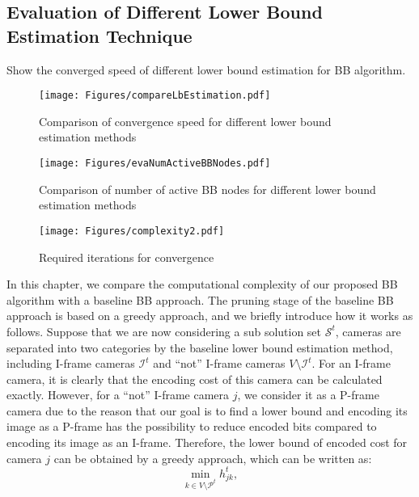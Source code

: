\subsection{Evaluation of Different Lower Bound Estimation Technique}
{\color{red}Show the converged speed of different lower bound estimation for BB algorithm.}
\begin{figure}
\begin{center}
\texttt{[image: Figures/compareLbEstimation.pdf]}
\caption{\label{fig::compareLbEstimation} Comparison of convergence speed for different lower bound estimation methods}
\end{center}
\end{figure}
%
\begin{figure}
\begin{center}
\texttt{[image: Figures/evaNumActiveBBNodes.pdf]}
\caption{\label{fig::evaNumActiveBBNodes} Comparison of number of active BB nodes for different lower bound estimation methods}
\end{center}
\end{figure}
%
\begin{figure}
\begin{center}
\texttt{[image: Figures/complexity2.pdf]}
\caption{\label{fig::complexity} Required iterations for convergence}
\end{center}
\end{figure}
%
In this chapter, we compare the computational complexity of our proposed BB algorithm with a baseline BB approach.
The pruning stage of the baseline BB approach is based on a greedy approach, and we briefly introduce how it works as follows.
Suppose that we are now considering a sub solution set $\mathcal{S}^t$, cameras are separated into two categories by the baseline lower bound estimation method, including I-frame cameras $\mathcal{I}^t$ and ``not'' I-frame cameras $V \setminus \mathcal{I}^t$.
For an I-frame camera, it is clearly that the encoding cost of this camera can be calculated exactly.
However, for a ``not'' I-frame camera $j$, we consider it as a P-frame camera due to the reason that our goal is to find a lower bound and encoding its image as a P-frame has the possibility to reduce encoded bits compared to encoding its image as an I-frame.
Therefore, the lower bound of encoded cost for camera $j$ can be obtained by a greedy approach, which can be written as:
\begin{equation}
\underset{k \in V \setminus \mathcal{P}^t}{\min} h_{jk}^t,
\label{eq::lbGreedy}
\end{equation}

